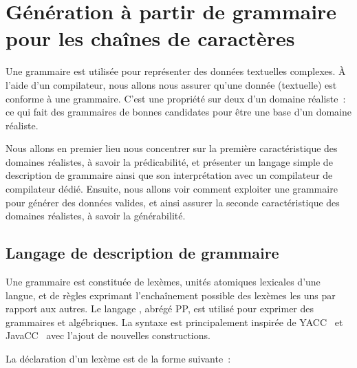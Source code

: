\section{Génération à partir de grammaire pour les chaînes de caractères}
\label{section:data:strings}

Une grammaire est utilisée pour représenter des données textuelles complexes.  À
l'aide d'un compilateur, nous allons nous assurer qu'une donnée (textuelle) est
conforme à une grammaire. C'est une propriété sur deux d'un domaine réaliste~:
ce qui fait des grammaires de bonnes candidates pour être une base d'un domaine
réaliste.

Nous allons en premier lieu nous concentrer sur la première caractéristique des
domaines réalistes, à savoir la prédicabilité, et présenter un langage simple de
description de grammaire ainsi que son interprétation avec un compilateur de
compilateur dédié. Ensuite, nous allons voir comment exploiter une grammaire
pour générer des données valides, et ainsi assurer la seconde caractéristique
des domaines réalistes, à savoir la générabilité.

\subsection{Langage de description de grammaire}
\label{subsection:data:pp}

Une grammaire est constituée de {\strong lexèmes}, unités atomiques lexicales
d'une langue, et de {\strong règles} exprimant l'enchaînement possible des
lexèmes les uns par rapport aux autres. Le langage ,
abrégé PP, est utilisé pour exprimer des grammaires  et
algébriques. La syntaxe est principalement inspirée de YACC~ et
JavaCC~ avec l'ajout de nouvelles constructions.

La déclaration d'un lexème est de la forme suivante~:

